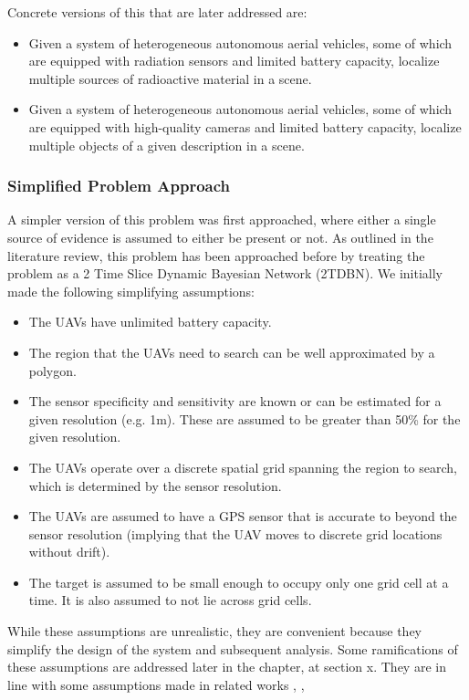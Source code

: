 Concrete versions of this that are later addressed are:
\begin{itemize}
    \item Given a system of heterogeneous autonomous aerial vehicles, some of which are equipped with radiation sensors and limited battery capacity, localize multiple sources of radioactive material in a scene.
    \item Given a system of heterogeneous autonomous aerial vehicles, some of which are equipped with high-quality cameras and limited battery capacity, localize multiple objects of a given description in a scene.
\end{itemize}
\par

\subsubsection{Simplified Problem Approach}
A simpler version of this problem was first approached, where either a single source of evidence is assumed to either be present or not. As outlined in the literature review, this problem has been approached before by treating the problem as a 2 Time Slice Dynamic Bayesian Network (2TDBN). We initially made the following simplifying assumptions:
\begin{itemize}
    \item The UAVs have unlimited battery capacity.
    \item The region that the UAVs need to search can be well approximated by a polygon.
    \item The sensor specificity and sensitivity are known or can be estimated for a given resolution (e.g. 1m). These are assumed to be greater than 50\% for the given resolution.
    \item The UAVs operate over a discrete spatial grid spanning the region to search, which is determined by the sensor resolution.
    \item The UAVs are assumed to have a GPS sensor that is accurate to beyond the sensor resolution (implying that the UAV moves to discrete grid locations without drift).
    \item The target is assumed to be small enough to occupy only one grid cell at a time. It is also assumed to not lie across grid cells.
\end{itemize}
While these assumptions are unrealistic, they are convenient because they simplify the design of the system and subsequent analysis. Some ramifications of these assumptions are addressed later in the chapter, at section x. They are in line with some assumptions made in related works \cite{ChungASearch}, \cite{Waharte2010SupportingUAVs}, %

